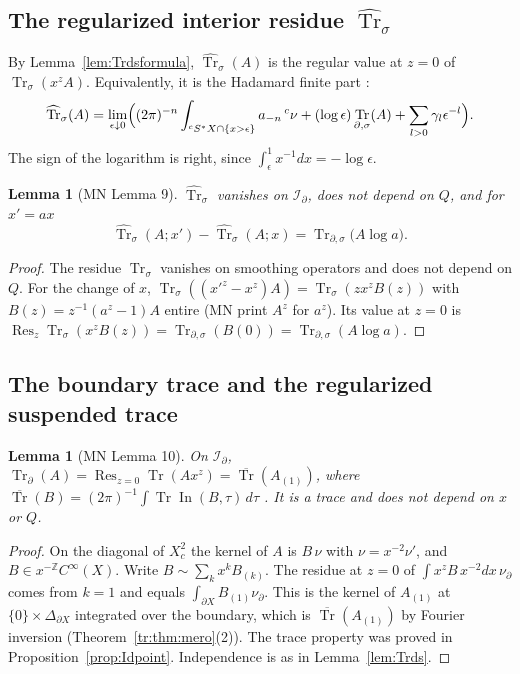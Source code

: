 \documentclass[11pt,oneside,reqno]{article}
\DeclareMathOperator{\Tr}{Tr}
\DeclareMathOperator{\In}{In}
\DeclareMathOperator{\Res}{Res}
\newcommand{\Z}{\mathbb Z}
\newcommand{\Id}{\mathcal I_\partial}
\newcommand{\Trs}{\Tr_\sigma}
\newcommand{\Trd}{\Tr_\partial}
\newcommand{\Trds}{\Tr_{\partial,\sigma}}
\newcommand{\hTrs}{\widehat{\Tr}_\sigma}
\newcommand{\bTr}{\overline{\Tr}}
\newcommand{\CI}{C^\infty}
\newcommand{\Y}{{}^cS^*X}
\theoremstyle{plain}
\newtheorem{lemma}[theorem]{Lemma}
\theoremstyle{definition}
\theoremstyle{remark}
\begin{document}
\subsection{The regularized interior residue \texorpdfstring{\(\hTrs\)}{}}
By Lemma~\ref{lem:Trdsformula}, \(\hTrs(A)\) is the regular value at
\(z=0\) of \(\Trs(x^zA)\). Equivalently, it is the Hadamard finite part
\cite[(55)]{MN}:
\begin{equation}\label{eq:55}
 \hTrs(A)=\lim_{\epsilon\downarrow0}\Bigl((2\pi)^{-n}\int_{\Y\cap\{x>\epsilon\}}
 a_{-n}\,{}^c\nu+(\log\epsilon)\Trds(A)+\sum_{l>0}\gamma_l\epsilon^{-l}\Bigr).
\end{equation}
The sign of the logarithm is right, since \(\int_\epsilon^1x^{-1}dx=
-\log\epsilon\).

\begin{lemma}[MN Lemma 9]\label{lem:hTrs}
\(\hTrs\) vanishes on \(\Id\), does not depend on \(Q\), and for \(x'=ax\)
\[
 \hTrs(A;x')-\hTrs(A;x)=\Trds\bigl(A\log a\bigr).
\]
\end{lemma}

\begin{proof}
The residue \(\Trs\) vanishes on smoothing operators and does not depend on
\(Q\). For the change of \(x\), \(\Trs((x'^z-x^z)A)=\Trs(zx^zB(z))\) with
\(B(z)=z^{-1}(a^z-1)A\) entire (MN print \(A^z\) for \(a^z\)). Its value
at \(z=0\) is \(\Res_z\Trs(x^zB(z))=\Trds(B(0))=\Trds(A\log a)\).
\end{proof}

\subsection{The boundary trace and the regularized suspended trace}

\begin{lemma}[MN Lemma 10]\label{lem:Trd}
On \(\Id\), \(\Trd(A)=\Res_{z=0}\Tr(Ax^z)=\bTr(A_{(1)})\), where
\(\bTr(B)=(2\pi)^{-1}\int\Tr\In(B,\tau)\,d\tau\) \cite[(57)]{MN}. It is a
trace and does not depend on \(x\) or \(Q\).
\end{lemma}

\begin{proof}
On the diagonal of \(X_c^2\) the kernel of \(A\) is \(B\,\nu\) with
\(\nu=x^{-2}\nu'\), and \(B\in x^{-\Z}\CI(X)\). Write
\(B\sim\sum_kx^kB_{(k)}\). The residue at \(z=0\) of
\(\int x^zB\,x^{-2}dx\,\nu_\partial\) comes from \(k=1\) and equals
\(\int_{\partial X}B_{(1)}\nu_\partial\). This is the kernel of
\(A_{(1)}\) at \(\{0\}\times\Delta_{\partial X}\) integrated over the
boundary, which is \(\bTr(A_{(1)})\) by Fourier inversion
(Theorem~\ref{tr:thm:mero}(2)). The trace property was proved in
Proposition~\ref{prop:Idpoint}. Independence is as in
Lemma~\ref{lem:Trds}.
\end{proof}
\end{document}
